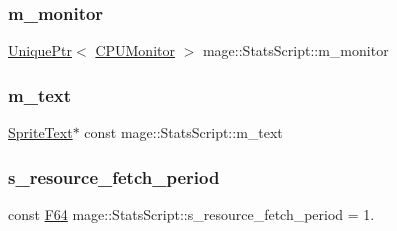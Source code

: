 \hypertarget{classmage_1_1_stats_script_a12e321d8fe1003de3643c4b799dd4c8f}{}\label{classmage_1_1_stats_script_a12e321d8fe1003de3643c4b799dd4c8f} 
\subsubsection{\texorpdfstring{m\+\_\+monitor}{m\_monitor}}
{\footnotesize\ttfamily \hyperlink{namespacemage_a3316d7143a973e37adf1110f2e80ca31}{Unique\+Ptr}$<$ \hyperlink{classmage_1_1_c_p_u_monitor}{C\+P\+U\+Monitor} $>$ mage\+::\+Stats\+Script\+::m\+\_\+monitor\hspace{0.3cm}{\ttfamily [private]}}

\hypertarget{classmage_1_1_stats_script_a15f95a755a20b01a80df24a8c073b6c5}{}\label{classmage_1_1_stats_script_a15f95a755a20b01a80df24a8c073b6c5} 
\subsubsection{\texorpdfstring{m\+\_\+text}{m\_text}}
{\footnotesize\ttfamily \hyperlink{classmage_1_1_sprite_text}{Sprite\+Text}$\ast$ const mage\+::\+Stats\+Script\+::m\+\_\+text\hspace{0.3cm}{\ttfamily [private]}}

\hypertarget{classmage_1_1_stats_script_acf98f29dd44164fb7d5859a8d5b297fa}{}\label{classmage_1_1_stats_script_acf98f29dd44164fb7d5859a8d5b297fa} 
\subsubsection{\texorpdfstring{s\+\_\+resource\+\_\+fetch\+\_\+period}{s\_resource\_fetch\_period}}
{\footnotesize\ttfamily const \hyperlink{namespacemage_ad26233bbec640deda836e572c1a23708}{F64} mage\+::\+Stats\+Script\+::s\+\_\+resource\+\_\+fetch\+\_\+period = 1.\hspace{0.3cm}{\ttfamily [static]}}


